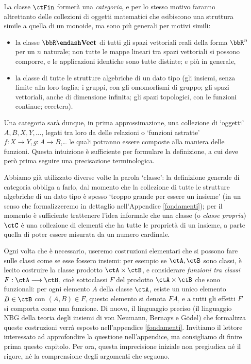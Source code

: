 \begin{example}
	La classe \(\ctFin\) formerà una \emph{categoria}, e per lo stesso motivo faranno altrettanto delle collezioni di oggetti matematici che esibiscono una struttura simile a quella di un monoide, ma sono più generali per motivi simili:
	\begin{itemize}
		\item {} la classe \(\bbR\emdash\ctVect\) di tutti gli spazi vettoriali reali della forma \(\bbR^n\) per un \(n\) %
		      naturale; non tutte le mappe lineari tra spazi vettoriali si possono comporre, e le applicazioni identiche sono tutte distinte; e più in generale,
		\item la classe di tutte le strutture algebriche di un dato tipo (gli insiemi, senza limite alla loro taglia; i gruppi, con gli omomorfismi di gruppo; gli spazi vettoriali, anche di dimensione infinita; gli spazi topologici, con le funzioni continue; eccetera).
	\end{itemize}
\end{example}
Una categoria sarà dunque, in prima approssimazione, una collezione di `oggetti' \(A,B,X,Y,\dots\), legati tra loro da delle relazioni o `funzioni astratte' \(f : X\to Y, g : A\to B\),\dots{} le quali potranno essere composte alla maniera delle funzioni. Questa intuizione è sufficiente per formulare la definizione, a cui deve però prima seguire una precisazione terminologica.
\begin{remark}
	Abbiamo già utilizzato diverse volte la parola `classe': la definizione generale di categoria obbliga a farlo, dal momento che la collezione di tutte le strutture algebriche di un dato tipo è spesso `troppo grande per essere un insieme' (in un senso che formalizzeremo in dettaglio nell'Appendice \ref{fondamenti}); per il momento è sufficiente trattenere l'idea informale che una classe (o \emph{classe propria}) \(\ctC\) è una collezione di elementi che ha tutte le proprietà di un insieme, a parte quella di poter essere misurata da un numero cardinale.

	Ogni volta che è necessario, useremo costruzioni elementari che si possono fare sulle classi come se esse fossero insiemi: per esempio se \(\ctA,\ctB\) sono classi, è lecito costruire la classe prodotto \(\ctA\times\ctB\), e considerare \emph{funzioni tra classi} \(F : \ctA\fun\ctB\), cioè sottoclassi \(F\) del prodotto \(\ctA\times\ctB\) che sono funzionali: per ogni elemento \(A\) della classe \(\ctA\), esiste un unico elemento \(B\in\ctB\) con \((A,B)\in F\), questo elemento si denota \(FA\), e a tutti gli effetti \(F\) si comporta come una funzione. Di nuovo, il linguaggio preciso (il linguaggio \textsf{NBG} della teoria degli insiemi di von Neumann, Bernays e G\"odel) che formalizza queste costruzioni verrà esposto nell'appendice \ref{fondamenti}. Invitiamo il lettore interessato ad approfondire la questione nell'appendice, ma consigliamo di finire prima questo capitolo. Per ora, questa imprecisione iniziale non pregiudica né il rigore, né la comprensione degli argomenti che seguono.
\end{remark}
